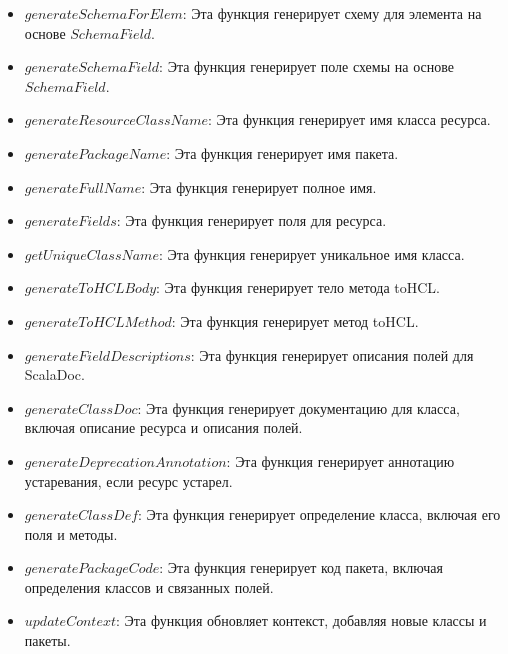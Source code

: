 \begin{itemize}
    \item $generateSchemaForElem$: Эта функция генерирует схему для элемента на
  основе  \newline $SchemaField$.

    \item $generateSchemaField$: Эта функция генерирует поле схемы на основе
  $SchemaField$.

    \item $generateResourceClassName$: Эта функция генерирует имя класса
ресурса.

    \item $generatePackageName$: Эта функция генерирует имя пакета.

    \item $generateFullName$: Эта функция генерирует полное имя.

    \item $generateFields$: Эта функция генерирует поля для ресурса.

    \item $getUniqueClassName$: Эта функция генерирует уникальное имя класса.

    \item $generateToHCLBody$: Эта функция генерирует тело метода toHCL.

    \item $generateToHCLMethod$: Эта функция генерирует метод toHCL.

    \item $generateFieldDescriptions$: Эта функция генерирует описания полей для
  ScalaDoc.

    \item $generateClassDoc$: Эта функция генерирует документацию для класса,
  включая описание ресурса и описания полей.

    \item $generateDeprecationAnnotation$: Эта функция генерирует аннотацию
  устаревания, если ресурс устарел.

    \item $generateClassDef$: Эта функция генерирует определение класса, включая
  его поля и методы.

    \item $generatePackageCode$: Эта функция генерирует код пакета, включая
  определения классов и связанных полей.

    \item $updateContext$: Эта функция обновляет контекст, добавляя новые классы
и
  пакеты.


\end{itemize}
